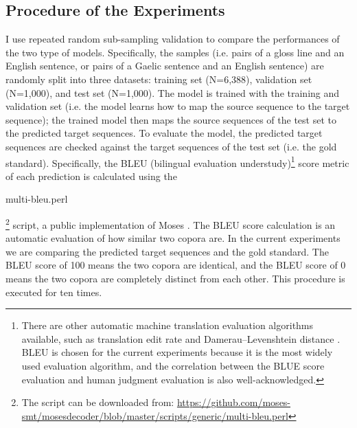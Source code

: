 \documentclass[a4paper]{article}
\begin{document}
\subsection{Procedure of the Experiments}
I use repeated random sub-sampling validation to compare the performances of the two type of models. 
Specifically, the samples (i.e. pairs of a gloss line and an English sentence, or pairs of a Gaelic sentence and an English sentence) are randomly split into three datasets: training set (N=6,388), validation set (N=1,000), and test set (N=1,000). The model is trained with the training and validation set (i.e. the model learns how to map the source sequence to the target sequence); the trained model then maps the source sequences of the test set to the predicted target sequences. To evaluate the model, the predicted target sequences are checked against the target sequences of the test set (i.e. the gold standard). Specifically, the BLEU (bilingual evaluation understudy)\footnote{There are other automatic machine translation evaluation algorithms available, such as translation edit rate \citep{Ter} and Damerau–Levenshtein distance \citep{damerau1964technique, levenshtein1966binary}. BLEU is chosen for the current experiments because it is the most widely used evaluation algorithm, and the correlation between the BLUE score evaluation and human judgment evaluation is also well-acknowledged.} score metric \citep{bleu} of each prediction is calculated using the \begin{myfont} multi-bleu.perl\end{myfont}\footnote{The script can be downloaded from: \url{https://github.com/moses-smt/mosesdecoder/blob/master/scripts/generic/multi-bleu.perl}} 
script, a public implementation of Moses \citep{moses}. The BLEU score calculation is an automatic evaluation of how similar two copora are. In the current experiments we are comparing the predicted target sequences and the gold standard. The BLEU score of 100 means the two copora are identical, and the BLEU score of 0 means the two copora are completely distinct from each other.
This procedure is executed for ten times. 
\end{document}
